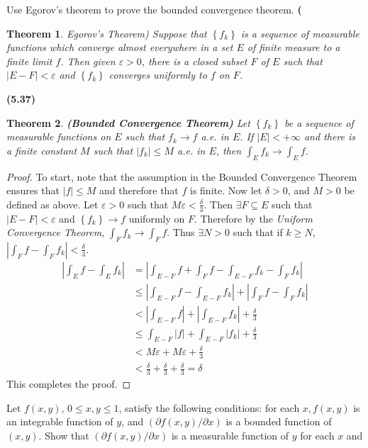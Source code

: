 \documentclass[12pt]{book}
\newcommand{\set}[1]{\left\{ #1 \right\}}
\renewcommand{\ss}{\subseteq}
\renewcommand{\.}{\mkern1mu}
\newcommand{\e}{\varepsilon}
\newcommand{\abs}[1]{\left| #1 \right|}
\newenvironment{pf}{\begin{proof}\setlength{\parindent}{\normalparindent}\setlength{\parskip}{\normalparskip}}{\end{proof}}
\theoremstyle{theorem}
\newtheorem{theorem}{Theorem}
\newcommand{\thmindent}{\setlength{\parindent}{17pt}}
\newenvironment{thm}[1]
	{\noindent \textbf{#1}\hspace{2ex}\begin{minipage}[t]{\linewidth - \widthof{\textbf{(#1)}}}  \begin{theorem}\thmindent }
	{\end{theorem}\end{minipage}\medskip}
\newlength{\normalparindent}
\newlength{\normalparskip}
\begin{document}
	\item Use Egorov's theorem to prove the bounded convergence theorem.
		\begin{thm}{4.17}
			(Egorov's Theorem) Suppose that $\set{f_k}$ is a sequence of measurable functions which converge almost everywhere in a set $E$ of finite measure to a finite limit $f$. Then given $\e > 0$, there is a closed subset $F$ of $E$ such that $\abs{E-F} < \e$ and $\set{f_k}$ converges uniformly to $f$ on $F$.
		\end{thm}
		\begin{thm}{(5.37)} \textbf{(Bounded Convergence Theorem)} Let $\set{f_k}$ be a sequence of measurable functions on $E$ such that $f_k \to f$ a.e. in $E$. If $\abs{E} < +\infty$ and there is a finite constant $M$ such that $\abs{f_k} \leq M$ a.e. in $E$, then $\int_E f_k \to \int_E f$.		
		\end{thm}
		\begin{pf}
			To start, note that the assumption in the Bounded Convergence Theorem ensures that $\abs{f} \leq M$ and therefore that $f$ is finite. Now let $\delta > 0$, and $M > 0$ be defined as above. Let $\e > 0$ such that $M\e < \frac{\delta}{3}$. Then $\exists F\ss E$ such that $\abs{E-F} < \e$ and $\set{f_k} \to f$ uniformly on $F$. Therefore by the \textit{Uniform Convergence Theorem}, $\int_F f_k \to \int_F f$. Thus $\exists N > 0$ such that if $k \geq N$, $\abs{\int_F f - \int_F f_k} < \frac{\delta}{3}$. 
			\begin{align*}
				\abs{\int_E f - \int_E f_k} &= \abs{\int_{E-F} f + \int_F f - \int_{E-F} f_k - \int_F f_k}\\
					&\leq \abs{\int_{E-F} f - \int_{E-F} f_k} + \abs{\int_F f - \int_F f_k}\\
					&< \abs{\int_{E-F} f} + \abs{\int_{E-F} f_k} + \frac{\delta}{3}\\
					&\leq \int_{E-F} \abs{f} + \int_{E-F} \abs{f_k} + \frac{\delta}{3}\\
					&< M\e + M\e + \frac{\delta}{3}\\
					&< \frac{\delta}{3} + \frac{\delta}{3} + \frac{\delta}{3} = \delta
			\end{align*}
		This completes the proof.
		\end{pf}
	\item Let $f(x,y)$, $0 \leq x,y \leq 1$, satisfy the following conditions: for each $x, f(x,y)$ is an integrable function of $y$, and $(\partial f(x,y)/ \partial x)$ is a bounded function of $(x,y)$. Show that $(\partial f(x,y)/ \partial x)$ is a measurable function of $y$ for each $x$ and 
\end{document}
